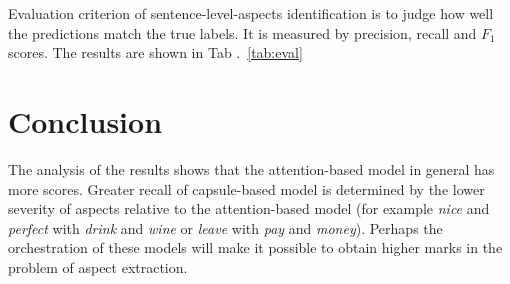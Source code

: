 \documentclass{article}
\begin{document}
Evaluation criterion of sentence-level-aspects identification is to judge how well the predictions match the true labels. It is measured by precision, recall and $F_1$ scores. The results are shown in Tab .~\ref{tab:eval}



\section{Conclusion}
The analysis of the results shows that the attention-based model in general has more scores.
Greater recall of capsule-based model is determined by the lower severity of aspects relative to the attention-based model (for example \textit{nice} and \textit{perfect} with \textit{drink} and \textit{wine} or \textit{leave} with \textit{pay} and \textit{money}). Perhaps the orchestration of these models will make it possible to obtain higher marks in the problem of aspect extraction. \\ \\ \\ \\ \\ \\




\end{document}
